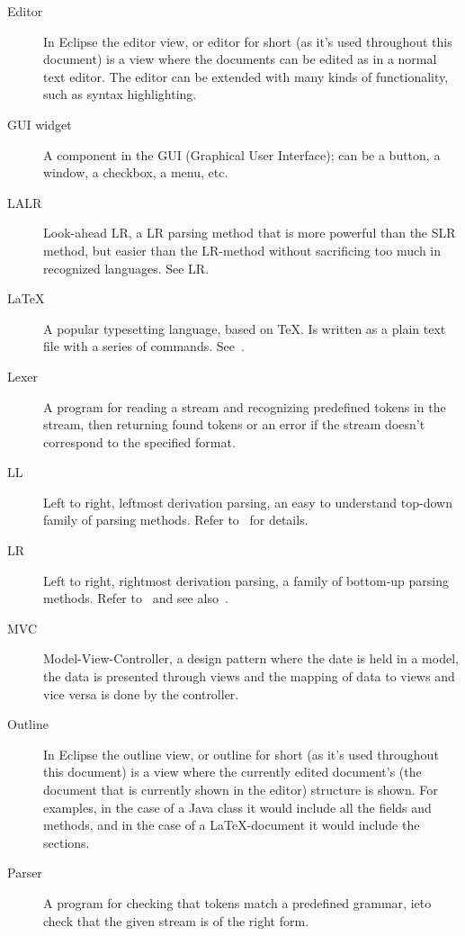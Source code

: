\documentclass[a4paper,11pt,twoside]{article}
\begin{document}
\begin{description}
\item[Editor] In Eclipse the editor view, or editor for short (as it's
  used throughout this document) is a view where the documents can be
  edited as in a normal text editor. The editor can be extended with 
  many kinds of functionality, such as syntax highlighting.

\item[GUI widget] A component in the GUI (Graphical User Interface);
  can be a button, a window, a checkbox, a menu, etc.

\item[LALR] Look-ahead LR, a LR parsing method that is more powerful
  than the SLR method, but easier than the LR-method without
  sacrificing too much in recognized languages. See LR.

\item[\LaTeX] A popular typesetting language, based on \TeX. Is
  written as a plain text file with a series of commands. 
  See~\cite{Lamport:LDP85}.

\item[Lexer] A program for reading a stream and recognizing predefined
  tokens in the stream, then returning found tokens or an error if the
  stream doesn't correspond to the specified format.
  
\item[LL] Left to right, leftmost derivation parsing, an easy to
  understand top-down family of parsing methods. Refer
  to~\cite{Aho:CPT86} for details.

\item[LR] Left to right, rightmost derivation parsing, a family of
  bottom-up parsing methods. Refer to~\cite{Aho:CPT86} and see
  also~\cite{Knuth:j-IC-8-6-607}.

\item[MVC] Model-View-Controller, a design pattern where the date is held
  in a model, the data is presented through views and the mapping of data
  to views and vice versa is done by the controller.

\item[Outline] In Eclipse the outline view, or outline for short (as it's
  used throughout this document) is a view where the currently edited 
  document's (the document that is currently shown in the editor) structure is 
  shown. For examples, in the case of a Java class it would include all the 
  fields and methods, and in the case of a \LaTeX -document it would include the
  sections.

\item[Parser] A program for checking that tokens match a 
  predefined grammar, ie\. to check that the given stream is of the
  right form.
  

\end{description}
\end{document}
